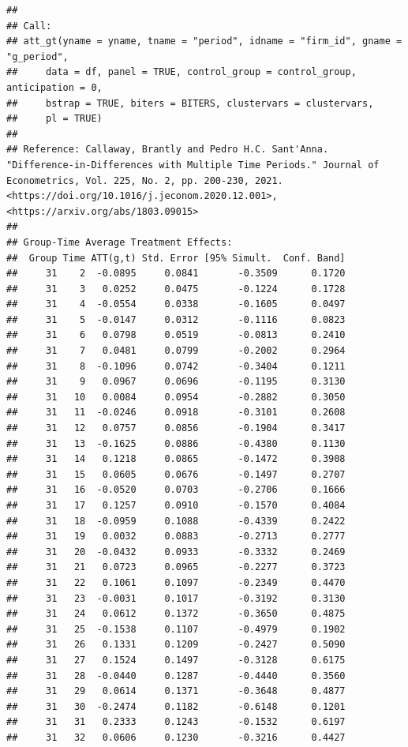 \documentclass[
]{article}
\begin{document}
\begin{verbatim}
## 
## Call:
## att_gt(yname = yname, tname = "period", idname = "firm_id", gname = "g_period", 
##     data = df, panel = TRUE, control_group = control_group, anticipation = 0, 
##     bstrap = TRUE, biters = BITERS, clustervars = clustervars, 
##     pl = TRUE)
## 
## Reference: Callaway, Brantly and Pedro H.C. Sant'Anna.  "Difference-in-Differences with Multiple Time Periods." Journal of Econometrics, Vol. 225, No. 2, pp. 200-230, 2021. <https://doi.org/10.1016/j.jeconom.2020.12.001>, <https://arxiv.org/abs/1803.09015> 
## 
## Group-Time Average Treatment Effects:
##  Group Time ATT(g,t) Std. Error [95% Simult.  Conf. Band]  
##     31    2  -0.0895     0.0841       -0.3509      0.1720  
##     31    3   0.0252     0.0475       -0.1224      0.1728  
##     31    4  -0.0554     0.0338       -0.1605      0.0497  
##     31    5  -0.0147     0.0312       -0.1116      0.0823  
##     31    6   0.0798     0.0519       -0.0813      0.2410  
##     31    7   0.0481     0.0799       -0.2002      0.2964  
##     31    8  -0.1096     0.0742       -0.3404      0.1211  
##     31    9   0.0967     0.0696       -0.1195      0.3130  
##     31   10   0.0084     0.0954       -0.2882      0.3050  
##     31   11  -0.0246     0.0918       -0.3101      0.2608  
##     31   12   0.0757     0.0856       -0.1904      0.3417  
##     31   13  -0.1625     0.0886       -0.4380      0.1130  
##     31   14   0.1218     0.0865       -0.1472      0.3908  
##     31   15   0.0605     0.0676       -0.1497      0.2707  
##     31   16  -0.0520     0.0703       -0.2706      0.1666  
##     31   17   0.1257     0.0910       -0.1570      0.4084  
##     31   18  -0.0959     0.1088       -0.4339      0.2422  
##     31   19   0.0032     0.0883       -0.2713      0.2777  
##     31   20  -0.0432     0.0933       -0.3332      0.2469  
##     31   21   0.0723     0.0965       -0.2277      0.3723  
##     31   22   0.1061     0.1097       -0.2349      0.4470  
##     31   23  -0.0031     0.1017       -0.3192      0.3130  
##     31   24   0.0612     0.1372       -0.3650      0.4875  
##     31   25  -0.1538     0.1107       -0.4979      0.1902  
##     31   26   0.1331     0.1209       -0.2427      0.5090  
##     31   27   0.1524     0.1497       -0.3128      0.6175  
##     31   28  -0.0440     0.1287       -0.4440      0.3560  
##     31   29   0.0614     0.1371       -0.3648      0.4877  
##     31   30  -0.2474     0.1182       -0.6148      0.1201  
##     31   31   0.2333     0.1243       -0.1532      0.6197  
##     31   32   0.0606     0.1230       -0.3216      0.4427  

\end{verbatim}
\end{document}

